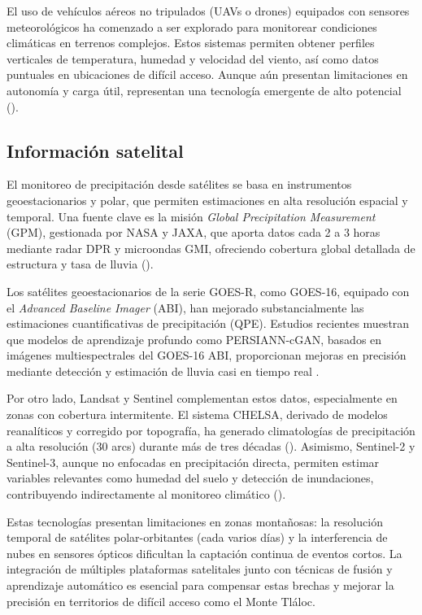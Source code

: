 El uso de vehículos aéreos no tripulados (UAVs o drones) equipados con sensores meteorológicos ha comenzado a ser explorado para monitorear condiciones climáticas en terrenos complejos. Estos sistemas permiten obtener perfiles verticales de temperatura, humedad y velocidad del viento, así como datos puntuales en ubicaciones de difícil acceso. Aunque aún presentan limitaciones en autonomía y carga útil, representan una tecnología emergente de alto potencial  (\cite{villa2016uav}).


\subsection{Información satelital}

El monitoreo de precipitación desde satélites se basa en instrumentos geoestacionarios y polar, que permiten estimaciones en alta resolución espacial y temporal. Una fuente clave es la misión \emph{Global Precipitation Measurement} (GPM), gestionada por NASA y JAXA, que aporta datos cada 2 a 3 horas mediante radar DPR y microondas GMI, ofreciendo cobertura global detallada de estructura y tasa de lluvia (\cite{gpm2014}).

Los satélites geoestacionarios de la serie GOES-R, como GOES-16, equipado con el \emph{Advanced Baseline Imager} (ABI), han mejorado substancialmente las estimaciones cuantificativas de precipitación (QPE). Estudios recientes muestran que modelos de aprendizaje profundo como PERSIANN-cGAN, basados en imágenes multiespectrales del GOES-16 ABI, proporcionan mejoras en precisión mediante detección y estimación de lluvia casi en tiempo real \cite{hayatbini2019}.

Por otro lado, Landsat y Sentinel complementan estos datos, especialmente en zonas con cobertura intermitente. El sistema CHELSA, derivado de modelos reanalíticos y corregido por topografía, ha generado climatologías de precipitación a alta resolución (30 arcs) durante más de tres décadas (\cite{karger2016}). Asimismo, Sentinel-2 y Sentinel-3, aunque no enfocadas en precipitación directa, permiten estimar variables relevantes como humedad del suelo y detección de inundaciones, contribuyendo indirectamente al monitoreo climático (\cite{declaro2024}).

Estas tecnologías presentan limitaciones en zonas montañosas: la resolución temporal de satélites polar-orbitantes (cada varios días) y la interferencia de nubes en sensores ópticos dificultan la captación continua de eventos cortos. La integración de múltiples plataformas satelitales junto con técnicas de fusión y aprendizaje automático es esencial para compensar estas brechas y mejorar la precisión en territorios de difícil acceso como el Monte Tláloc.


